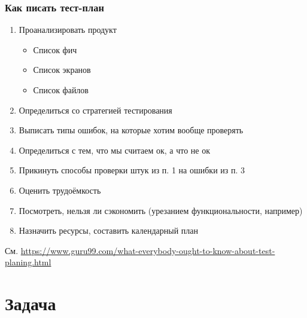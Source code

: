 \documentclass[xetex,mathserif,serif]{beamer}
\begin{document}
	\begin{frame}
		\frametitle{Как писать тест-план}
		\begin{enumerate}
			\item Проанализировать продукт
			\begin{itemize}
				\item Список фич
				\item Список экранов
				\item Список файлов
			\end{itemize}
			\item Определиться со стратегией тестирования
			\item Выписать типы ошибок, на которые хотим вообще проверять
			\item Определиться с тем, что мы считаем ок, а что не ок
			\item Прикинуть способы проверки штук из п. 1 на ошибки из п. 3
			\item Оценить трудоёмкость
			\item Посмотреть, нельзя ли сэкономить (урезанием функциональности, например)
			\item Назначить ресурсы, составить календарный план
		\end{enumerate}
	\begin{footnotesize}См. \url{https://www.guru99.com/what-everybody-ought-to-know-about-test-planing.html}\end{footnotesize}
	\end{frame}

	\section{Задача}
\end{document}
